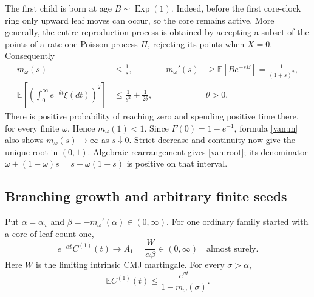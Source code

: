 The first child is born at age $B\sim\operatorname{Exp}(1)$.
Indeed, before the first core-clock ring only upward leaf moves
can occur, so the core remains active.  More generally, the entire
reproduction process is obtained by accepting a subset of the points
of a rate-one Poisson process $\Pi$, rejecting its points when $X=0$.
Consequently
\begin{align}
 m_\omega(s)&\le \frac1s,
 &
 -m_\omega'(s)&\ge\mathbb E[B e^{-sB}]
                  =\frac1{(1+s)^2},
 \label{van:first-child}\\
 \mathbb E\left[\left(\int_0^\infty e^{-\theta t}\xi(dt)\right)^2\right]
 &\le \frac1{\theta^2}+\frac1{2\theta},
 &&\theta>0.
 \label{van:second-moment}
\end{align}
There is positive probability of reaching zero and spending positive
time there, for every finite $\omega$.  Hence $m_\omega(1)<1$.
Since $F(0)=1-e^{-1}$, formula \eqref{van:m} also shows
$m_\omega(s)\to\infty$ as $s\downarrow0$.  Strict decrease and continuity
now give the unique root in $(0,1)$.  Algebraic rearrangement gives
\eqref{van:root}; its denominator
$\omega+(1-\omega)s=s+\omega(1-s)$ is positive on that interval.

\subsection{Branching growth and arbitrary finite seeds}

\begin{lemma}
\label{van:ordinary}
Put $\alpha=\alpha_\omega$ and
$\beta=-m_\omega'(\alpha)\in(0,\infty)$.
For one ordinary family started with a core of leaf count one,
\begin{equation}
 e^{-\alpha t}C^{(1)}(t)\longrightarrow
 A_1=\frac{W}{\alpha\beta}\in(0,\infty)
 \quad\text{almost surely}.
 \label{van:ordinary-limit}
\end{equation}
Here $W$ is the limiting intrinsic CMJ martingale.
For every $\sigma>\alpha$,
\begin{equation}
 \mathbb E C^{(1)}(t)
 \le \frac{e^{\sigma t}}{1-m_\omega(\sigma)}.
 \label{van:mean-bound}
\end{equation}
\end{lemma}

